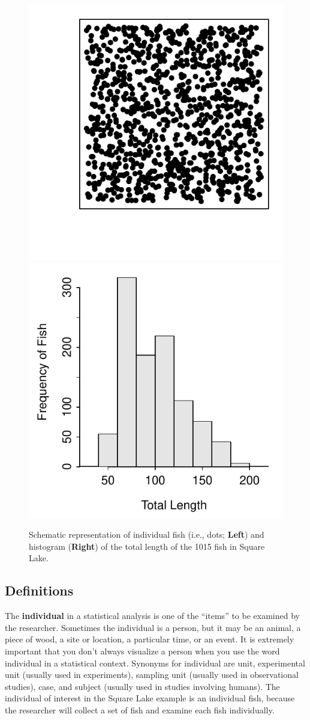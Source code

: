 \documentclass[10pt,openany]{book}\usepackage[]{graphicx}\usepackage[]{color}
\newenvironment{knitrout}{}{} %
\begin{document}
\begin{knitrout}
\color{fgcolor}\begin{figure}[hbtp]

{\centering \includegraphics[width=.4\linewidth]{Figs/SquareLakePopn-1} 
\includegraphics[width=.4\linewidth]{Figs/SquareLakePopn-2} 

}

\caption[Schematic representation of individual fish (i.e., dots]{Schematic representation of individual fish (i.e., dots; \textbf{Left}) and histogram (\textbf{Right}) of the total length of the 1015 fish in Square Lake.}\label{fig:SquareLakePopn}
\end{figure}


\end{knitrout}

\subsection{Definitions}
The \textbf{individual} in a statistical analysis is one of the ``items'' to be examined by the researcher.  Sometimes the individual is a person, but it may be an animal, a piece of wood, a site or location, a particular time, or an event.  It is extremely important that you don't always visualize a person when you use the word individual in a statistical context.  Synonyms for individual are unit, experimental unit (usually used in experiments), sampling unit (usually used in observational studies), case, and subject (usually used in studies involving humans).  The individual of interest in the Square Lake example is an individual fish, because the researcher will collect a set of fish and examine each fish individually.
\end{document}
